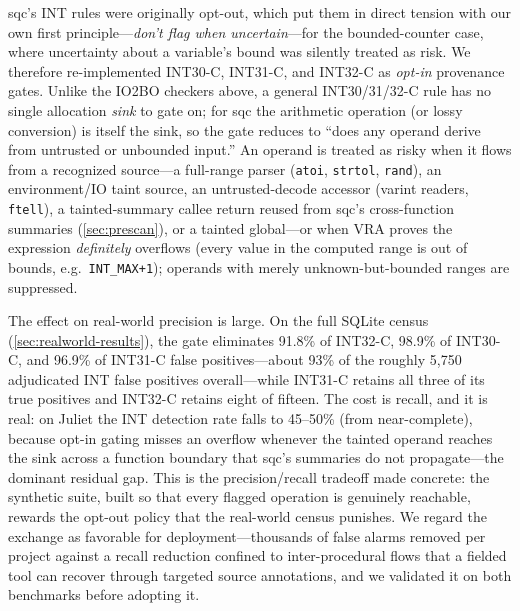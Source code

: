 sqc's INT rules were originally opt-out, which put them in direct
tension with our own first principle---\emph{don't flag when
uncertain}---for the bounded-counter case, where uncertainty about a
variable's bound was silently treated as risk.  We therefore
re-implemented INT30-C, INT31-C, and INT32-C as \emph{opt-in}
provenance gates.  Unlike the IO2BO checkers above, a general
INT30/31/32-C rule has no single allocation \emph{sink} to gate on;
for sqc the arithmetic operation (or lossy conversion) is itself the
sink, so the gate reduces to ``does any operand derive from untrusted
or unbounded input.''  An operand is treated as risky when it flows
from a recognized source---a full-range parser (\texttt{atoi},
\texttt{strtol}, \texttt{rand}), an environment/IO taint source, an
untrusted-decode accessor (varint readers, \texttt{ftell}), a
tainted-summary callee return reused from sqc's cross-function
summaries (\cref{sec:prescan}), or a tainted global---or when VRA
proves the expression \emph{definitely} overflows (every value in the
computed range is out of bounds, e.g.\ \texttt{INT\_MAX+1}); operands
with merely unknown-but-bounded ranges are suppressed.

The effect on real-world precision is large.  On the full SQLite
census (\cref{sec:realworld-results}), the gate eliminates 91.8\% of INT32-C,
98.9\% of INT30-C, and 96.9\% of INT31-C false positives---about 93\%
of the roughly 5{,}750 adjudicated INT false positives overall---while
INT31-C retains all three of its true positives and INT32-C retains
eight of fifteen.  The cost is recall, and it is real: on Juliet the
INT detection rate falls to 45--50\% (from near-complete), because
opt-in gating misses an overflow whenever the tainted operand reaches
the sink across a function boundary that sqc's summaries do not
propagate---the dominant residual gap.  This is the precision/recall
tradeoff made concrete: the synthetic suite, built so that every
flagged operation is genuinely reachable, rewards the opt-out policy
that the real-world census punishes.  We regard the exchange as
favorable for deployment---thousands of false alarms removed per
project against a recall reduction confined to inter-procedural flows
that a fielded tool can recover through targeted source annotations,
and we validated it on both benchmarks before adopting it.

